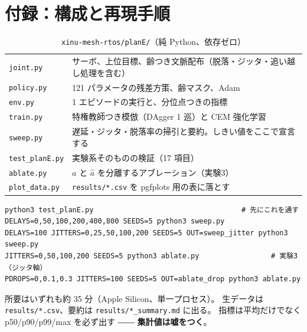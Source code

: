 \documentclass[11pt,a4paper]{article}
\newcommand{\code}[1]{\texttt{#1}}
\newcommand{\keyp}[1]{\textbf{\textcolor{blue!45!black}{#1}}}
\begin{document}
\section*{付録：構成と再現手順}

\begin{table}[htbp]
\centering
\small
\caption{\code{xinu-mesh-rtos/planE/}（純 Python、依存ゼロ）}
\begin{tabularx}{\textwidth}{@{}l X@{}}
\toprule
\code{joint.py} & サーボ、上位目標、齢つき文脈配布（脱落・ジッタ・追い越し処理を含む） \\
\code{policy.py} & 121 パラメータの残差方策、齢マスク、Adam \\
\code{env.py} & 1 エピソードの実行と、分位点つきの指標 \\
\code{train.py} & 特権教師つき模倣（DAgger 1 巡）と CEM 強化学習 \\
\code{sweep.py} & 遅延・ジッタ・脱落率の掃引と要約。しきい値をここで宣言する \\
\code{test\_planE.py} & 実験系そのものの検証（17 項目） \\
\code{ablate.py} & $a$ と $\hat a$ を分離するアブレーション（実験3） \\
\code{plot\_data.py} & \code{results/*.csv} を pgfplots 用の表に落とす \\
\bottomrule
\end{tabularx}
\end{table}

\begin{verbatim}
python3 test_planE.py                                   # 先にこれを通す
DELAYS=0,50,100,200,400,800 SEEDS=5 python3 sweep.py
DELAYS=100 JITTERS=0,25,50,100,200 SEEDS=5 OUT=sweep_jitter python3 sweep.py
JITTERS=0,50,100,200 SEEDS=5 python3 ablate.py                 # 実験3（ジッタ軸）
PDROPS=0,0.1,0.3 JITTERS=100 SEEDS=5 OUT=ablate_drop python3 ablate.py
\end{verbatim}

\noindent
所要はいずれも約 35 分（Apple Silicon、単一プロセス）。
生データは \code{results/*.csv}、要約は \code{results/*\_summary.md} に出る。
指標は平均だけでなく p50/p90/p99/max を必ず出す ―― \keyp{集計値は嘘をつく}。
\end{document}
